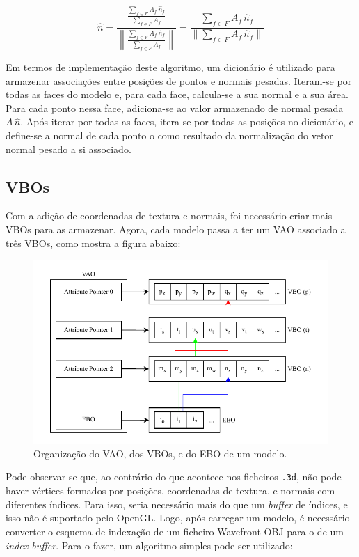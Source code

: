 \documentclass[12pt, a4paper]{article}
\begin{document}
$$
\hat{n} =
\frac{
    \frac{
        \sum_{f \in F} {A_f \, \hat{n}_f}
    }{
        \sum_{f \in F} {A_f}
    }
}{
    \left \lVert
    \frac{
        \sum_{f \in F} {A_f \, \hat{n}_f}
    }{
        \sum_{f \in F} {A_f}
    }
    \right \rVert
}
=
\frac{
    \sum_{f \in F} {A_f \, \hat{n}_f}
}{
    \lVert \sum_{f \in F} {A_f \, \hat{n}_f} \rVert
}
$$

Em termos de implementação deste algoritmo, um dicionário é utilizado para armazenar associações
entre posições de pontos e normais pesadas. Iteram-se por todas as faces do modelo e, para cada
face, calcula-se a sua normal e a sua área. Para cada ponto nessa face, adiciona-se ao valor
armazenado de normal pesada $A \, \hat{n}$. Após iterar por todas as faces, itera-se por todas as
posições no dicionário, e define-se a normal de cada ponto o como resultado da normalização do vetor
normal pesado a si associado.

\subsection{VBOs}

Com a adição de coordenadas de textura e normais, foi necessário criar mais VBOs para as armazenar.
Agora, cada modelo passa a ter um VAO associado a três VBOs, como mostra a figura abaixo:

\begin{figure}[H]
    \centering
    \includegraphics[width=\textwidth]{res/phase4/VAO.pdf}
    \caption{Organização do VAO, dos VBOs, e do EBO de um modelo.}
\end{figure}

Pode observar-se que, ao contrário do que acontece nos ficheiros \texttt{.3d}, não pode haver
vértices formados por posições, coordenadas de textura, e normais com diferentes índices. Para isso,
seria necessário mais do que um \emph{buffer} de índices, e isso não é suportado pelo OpenGL. Logo,
após carregar um modelo, é necessário converter o esquema de indexação de um ficheiro Wavefront OBJ
para o de um \emph{index buffer}. Para o fazer, um algoritmo simples pode ser utilizado:
\end{document}
